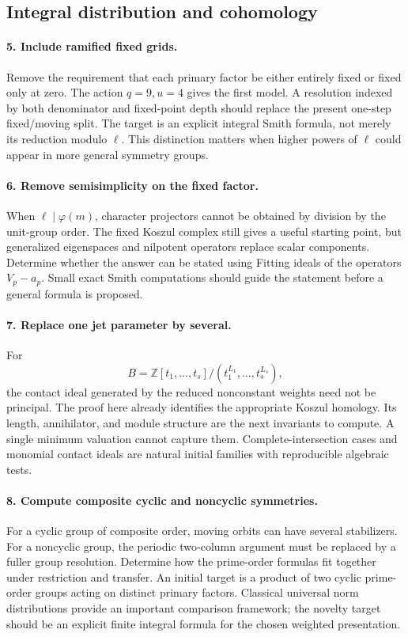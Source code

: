 \subsection{Integral distribution and cohomology}

\paragraph{5. Include ramified fixed grids.}
Remove the requirement that each primary factor be either entirely
fixed or fixed only at zero. The action $q=9,u=4$ gives the first
model. A resolution indexed by both denominator and fixed-point depth
should replace the present one-step fixed/moving split. The target is
an explicit integral Smith formula, not merely its reduction modulo
$\ell$. This distinction matters when higher powers of $\ell$ could
appear in more general symmetry groups.

\paragraph{6. Remove semisimplicity on the fixed factor.}
When $\ell\mid\varphi(m)$, character projectors cannot be obtained by
division by the unit-group order. The fixed Koszul complex still gives
a useful starting point, but generalized eigenspaces and nilpotent
operators replace scalar components. Determine whether the answer can
be stated using Fitting ideals of the operators $V_p-a_p$. Small exact
Smith computations should guide the statement before a general formula
is proposed.

\paragraph{7. Replace one jet parameter by several.}
For
\[
 B=\mathbb Z[t_1,\ldots,t_s]/(t_1^{L_1},\ldots,t_s^{L_s}),
\]
the contact ideal generated by the reduced nonconstant weights need
not be principal. The proof here already identifies the appropriate
Koszul homology. Its length, annihilator, and module structure are the
next invariants to compute. A single minimum valuation cannot capture
them. Complete-intersection cases and monomial contact ideals are
natural initial families with reproducible algebraic tests.

\paragraph{8. Compute composite cyclic and noncyclic symmetries.}
For a cyclic group of composite order, moving orbits can have several
stabilizers. For a noncyclic group, the periodic two-column argument
must be replaced by a fuller group resolution. Determine how the
prime-order formulas fit together under restriction and transfer.
An initial target is a product of two cyclic prime-order groups acting
on distinct primary factors. Classical universal norm distributions
\cite{cpc:Ouyang2002} provide an important comparison framework; the
novelty target should be an explicit finite integral formula for the
chosen weighted presentation.

